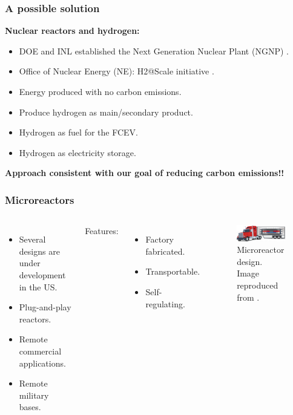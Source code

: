 \begin{frame}
\frametitle{A possible solution}
    \textbf{Nuclear reactors and hydrogen:}
    \begin{itemize}
    	\item DOE and INL established the Next Generation Nuclear Plant (NGNP) \cite{us_nrc_next_2017}.
		\item Office of Nuclear Energy (NE): H2@Scale initiative \cite{office_of_nuclear_energy_could_2018}.
	\end{itemize}

	\begin{itemize}
		\item Energy produced with no carbon emissions.
		\item Produce hydrogen as main/secondary product.
		\item Hydrogen as fuel for the FCEV.
		\item Hydrogen as electricity storage.
	\end{itemize}

	\centering
	\vspace{1cm}
	\textbf{Approach consistent with our goal of reducing carbon emissions!!}
\end{frame}


\begin{frame}
\frametitle{Microreactors}
\begin{columns}
	\column[t]{5cm}
	\begin{itemize}
		\item Several designs are under development in the US.
		\item Plug-and-play reactors.
		\item Remote commercial applications.
		\item Remote military bases.
	\end{itemize}
	\vspace{1cm}
	Features:
	\begin{itemize}
		\item Factory fabricated.
		\item Transportable.
		\item Self-regulating.
	\end{itemize}

    \column[t]{5cm}
	\begin{figure}[htbp!]
		\begin{center}
			\includegraphics[width=5.2cm]{images/microreactor}
		\end{center}
		\caption{Microreactor design. Image reproduced from \cite{doe_ultimate_2019}.}
	\end{figure}
\end{columns}
\end{frame}

